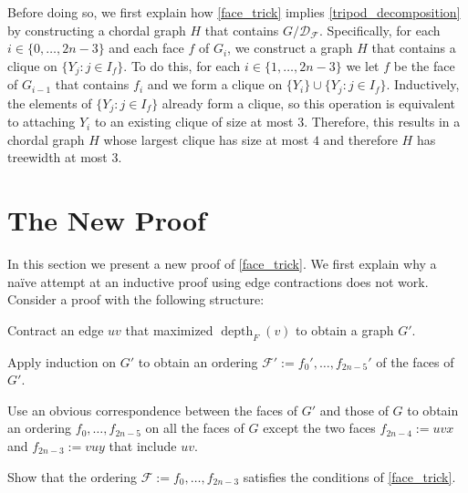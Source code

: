 \documentclass{patmorin}
\DeclareMathOperator{\depth}{depth}
\begin{document}
Before doing so, we first explain how \cref{face_trick} implies \cref{tripod_decomposition} by constructing a chordal graph $H$ that contains $G/\mathcal{D_F}$.  Specifically, for each $i\in\{0,\ldots,2n-3\}$ and each face $f$ of $G_i$, we construct a graph $H$ that contains a clique on $\{Y_j:j\in I_f\}$.  To do this, for each $i\in\{1,\ldots,2n-3\}$ we let $f$ be the face of $G_{i-1}$ that contains $f_i$ and we form a clique on  $\{Y_i\}\cup\{Y_j:j\in I_f\}$.  Inductively, the elements of $\{Y_j:j\in I_f\}$ already form a clique, so this operation is equivalent to attaching $Y_i$ to an existing clique of size at most $3$.  Therefore, this results in a chordal graph $H$ whose largest clique has size at most $4$ and therefore $H$ has treewidth at most $3$.


\section{The New Proof}

In this section we present a new proof of \cref{face_trick}.  We first explain why a naïve attempt at an inductive proof using edge contractions does not work. Consider a proof with the following structure:
\begin{compactenum}
  \item Contract an edge $uv$ that maximized $\depth_F(v)$ to obtain a graph $G'$.
  \item Apply induction on $G'$ to obtain an ordering $\mathcal{F}':=f_0',\ldots,f_{2n-5}'$ of the faces of $G'$.
  \item Use an obvious correspondence between the faces of $G'$ and those of $G$ to obtain an ordering $f_0,\ldots,f_{2n-5}$ on all the faces of $G$ except the two faces $f_{2n-4}:=uvx$ and $f_{2n-3}:=vuy$ that include $uv$.
  \item Show that the ordering $\mathcal{F}:=f_0,\ldots,f_{2n-3}$ satisfies the conditions of \cref{face_trick}.
\end{compactenum}
\end{document}
